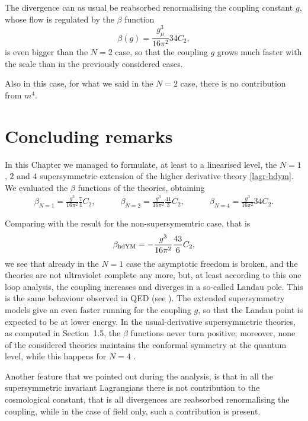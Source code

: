 The divergence can as usual be reabsorbed renormalising the coupling constant $g$, whose flow is regulated by the $\beta$  function
\begin{equation}
\beta(g) =  \frac{g_\mu^3}{16 \pi^2} 34 C_2 ,
\end{equation}
is even bigger than the $N=2$ case, so that the coupling $g$ grows much faster with the scale than in the previously considered cases.

Also in this case, for what we said in the $N=2$ case, there is no contribution from $m^4.$




\section{Concluding remarks}

In this Chapter we managed to formulate, at least to a linearised level, the $N=1$, $2$ and $4$ supersymmetric extension of the higher derivative \ym{} theory \eqref{lagr-hdym}. We evaluated the $\beta$ functions of the theories, obtaining
\begin{align}
\beta_{N=1} =  \frac{g^3}{16 \pi^2} \frac{7}{4} C_2,
\qquad\quad
\beta_{N=2} =  \frac{g^3}{16 \pi^2} \frac{41}{3} C_2 ,
\qquad\quad
\beta_{N=4} =  \frac{g^3}{16 \pi^2} 34 C_2 .
\end{align}

Comparing with the result for the non-supersymemtric case, that is
\begin{align}
\beta_{{ \text{hd} }{ \text{YM} }} = - \frac{g^3}{16 \pi^2} \frac{43}{6} C_2,
\end{align}
we see that already in the $N=1$ case the asymptotic freedom is broken, and the theories are not ultraviolet complete any more, but, at least according to this one loop analysis, the coupling increases and diverges in a so-called Landau pole. This is the same behaviour observed in QED (see \eg{} \cite{Ram}). The extended supersymmetry models give an even faster running for the coupling $g$, so that the Landau point is expected to be at lower energy. In the usual-derivative supersymmetric theories, as computed in Section~1.5, the $\beta$ functions never turn positive; moreover, none of the considered theories maintains the conformal symmetry at the quantum level, while this happens for $N=4$ \sym{}.


Another feature that we pointed out during the analysis, is that in all the supersymmetric invariant Lagrangians there is not contribution to the cosmological constant, that is all divergences are reabsorbed renormalising the coupling, while in the case of  \ym{} field only, such a contribution is present.





